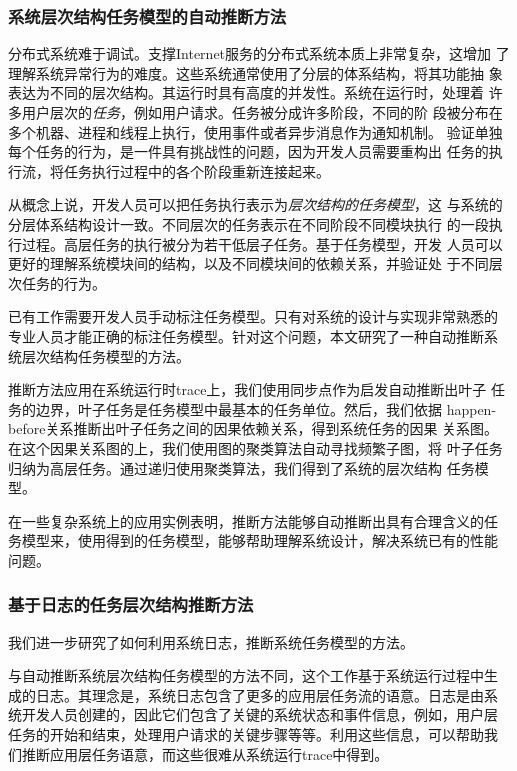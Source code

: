 \subsubsection*{系统层次结构任务模型的自动推断方法}

分布式系统难于调试。支撑Internet服务的分布式系统本质上非常复杂，这增加
了理解系统异常行为的难度。这些系统通常使用了分层的体系结构，将其功能抽
象表达为不同的层次结构。其运行时具有高度的并发性。系统在运行时，处理着
许多用户层次的\emph{任务}，例如用户请求。任务被分成许多阶段，不同的阶
段被分布在多个机器、进程和线程上执行，使用事件或者异步消息作为通知机制。
验证单独每个任务的行为，是一件具有挑战性的问题，因为开发人员需要重构出
任务的执行流，将任务执行过程中的各个阶段重新连接起来。

从概念上说，开发人员可以把任务执行表示为\emph{层次结构的任务模型}，这
与系统的分层体系结构设计一致。不同层次的任务表示在不同阶段不同模块执行
的一段执行过程。高层任务的执行被分为若干低层子任务。基于任务模型，开发
人员可以更好的理解系统模块间的结构，以及不同模块间的依赖关系，并验证处
于不同层次任务的行为。

已有工作需要开发人员手动标注任务模型。只有对系统的设计与实现非常熟悉的
专业人员才能正确的标注任务模型。针对这个问题，本文研究了一种自动推断系
统层次结构任务模型的方法。

推断方法应用在系统运行时trace上，我们使用同步点作为启发自动推断出叶子
任务的边界，叶子任务是任务模型中最基本的任务单位。然后，我们依据
happen-before关系推断出叶子任务之间的因果依赖关系，得到系统任务的因果
关系图。在这个因果关系图的上，我们使用图的聚类算法自动寻找频繁子图，将
叶子任务归纳为高层任务。通过递归使用聚类算法，我们得到了系统的层次结构
任务模型。

在一些复杂系统上的应用实例表明，推断方法能够自动推断出具有合理含义的任
务模型来，使用得到的任务模型，能够帮助理解系统设计，解决系统已有的性能
问题。

\subsubsection*{基于日志的任务层次结构推断方法}


我们进一步研究了如何利用系统日志，推断系统任务模型的方法。

与自动推断系统层次结构任务模型的方法不同，这个工作基于系统运行过程中生
成的日志。其理念是，系统日志包含了更多的应用层任务流的语意。日志是由系
统开发人员创建的，因此它们包含了关键的系统状态和事件信息，例如，用户层
任务的开始和结束，处理用户请求的关键步骤等等。利用这些信息，可以帮助我
们推断应用层任务语意，而这些很难从系统运行trace中得到。

